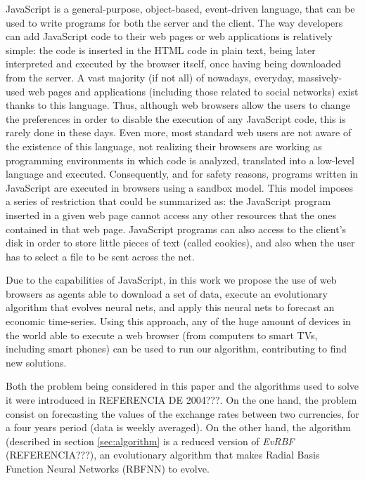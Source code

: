 \documentclass{llncs}
\begin{document}

JavaScript is a general-purpose, object-based, event-driven language, that can be used to write programs for both the server and the client.  The way developers can add JavaScript code to their web pages or web applications is relatively simple: the code is inserted in the HTML code in plain text, being later interpreted and executed by the browser itself, once having being downloaded from the server. A vast majority (if not all) of nowadays, everyday, massively-used web pages and applications (including those related to social networks) exist thanks to this language. Thus, although web browsers allow the users to change the preferences in order to disable the execution of any JavaScript code, this is rarely done in these days. Even more, most standard web users are not aware of the existence of this language, not realizing their browsers are working as programming environments in which code is analyzed, translated into a low-level language and executed. Consequently, and for safety reasons, programs written in JavaScript are executed in browsers using a sandbox model. This model imposes a series of restriction that could be summarized as: the JavaScript program inserted in a given web page cannot access any other resources that the ones contained in that web page. JavaScript programs can also access to the client's disk in order to store little pieces of text (called cookies), and also when the user has to select a file to be sent across the net. 

Due to the capabilities of JavaScript, in this work we propose the use of web browsers as agents able to download a set of data, execute an evolutionary algorithm that evolves neural nets, and apply this neural nets to forecast an economic time-series. Using this approach, any of the huge amount of devices in the world able to execute a web browser (from computers to smart TVs, including smart phones) can be used to run our algorithm, contributing to find new solutions.
 
Both the problem being considered in this paper and the algorithms used to solve it were introduced in REFERENCIA DE 2004???. On the one hand, the problem consist on forecasting the values of the 
exchange rates between two currencies, for a four years period (data is weekly averaged). On the other hand, the algorithm (described in section \ref{sec:algorithm} is a reduced version of {\em EvRBF} (REFERENCIA???), an evolutionary algorithm that makes Radial Basis Function Neural Networks (RBFNN) to evolve.
\end{document}
